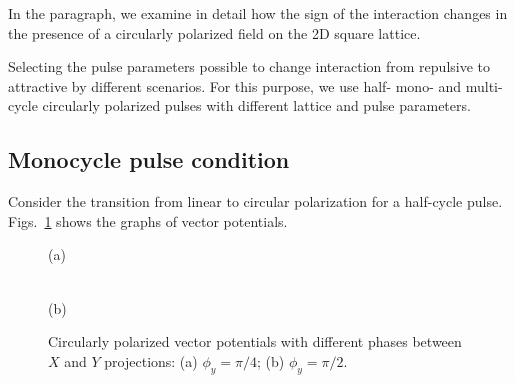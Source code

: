 In the paragraph, we examine in detail how the sign of the interaction changes in the presence of a circularly polarized field on the 2D square lattice. 

Selecting the pulse parameters possible to change interaction from repulsive to attractive by different scenarios. For this purpose, we use half- mono- and multi-cycle circularly polarized pulses with different lattice and pulse parameters. 

\subsection{Monocycle pulse condition}

Consider the transition from linear to circular polarization for a half-cycle pulse. Figs.~\ref{fig:Pulses_3} shows the graphs of vector potentials. 
\begin{figure}[h!]
\begin{minipage}[h]{0.5\linewidth}
 (a) \\
\end{minipage}
\begin{minipage}[h]{0.5\linewidth}
 \\(b)
\end{minipage}
\caption{Circularly polarized vector potentials with different phases between $X$ and $Y$ projections: (a) $\phi_y=\pi /4$; (b) $\phi_y=\pi /2$.}
\label{fig:Pulses_3}
\end{figure}
